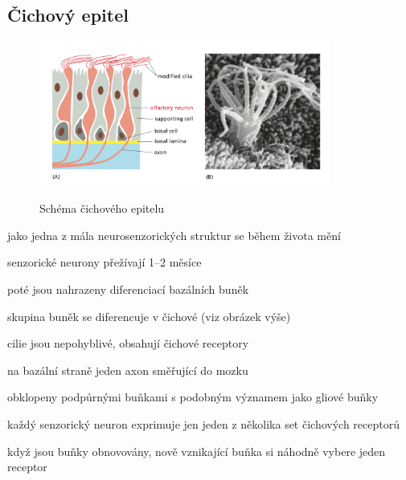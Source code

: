 \documentclass[DIV=8]{scrreprt}
\begin{document}
\subsection{Čichový epitel} \label{Čichový epitel}


\begin{figure}
    \caption{Schéma čichového epitelu}
    \includegraphics[width=0.85\textwidth]{nos.png}
    \centering
    \label{}
\end{figure}


\begin{myItemize}[nosep]
    \item jako jedna z mála neurosenzorických struktur se během života mění
\begin{myItemize}[nosep]
    \item senzorické neurony přežívají 1--2 měsíce
    \item poté jsou nahrazeny diferenciací bazálních buněk
\end{myItemize}

    \item skupina buněk se diferencuje v čichové (viz obrázek výše)
\begin{myItemize}[nosep]
    \item cilie jsou nepohyblivé, obsahují čichové receptory
    \item na bazální straně jeden axon směřující do mozku
    \item obklopeny podpůrnými buňkami s podobným významem jako gliové buňky
\end{myItemize}

    \item každý senzorický neuron exprimuje jen jeden z několika set čichových receptorů
\begin{myItemize}[nosep]
    \item když jsou buňky obnovovány, nově vznikající buňka si náhodně vybere jeden receptor
\end{myItemize}

\end{myItemize}
\end{document}
